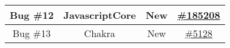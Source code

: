 \begin{table}[]
\begin{tabular}{|c|c|c|c|}
    Bug \#12 & JavascriptCore                                                  & New                                                                               & \href{https://bugs.webkit.org/show\_bug.cgi?id=185208}{\#185208}                                                                                               \\ \hline
    Bug \#13 & Chakra                                                          & New                                                                               & \href{https://github.com/Microsoft/ChakraCore/issues/5128}{\#5128}                                                                      \\ \hline
    \end{tabular}
    \end{table}